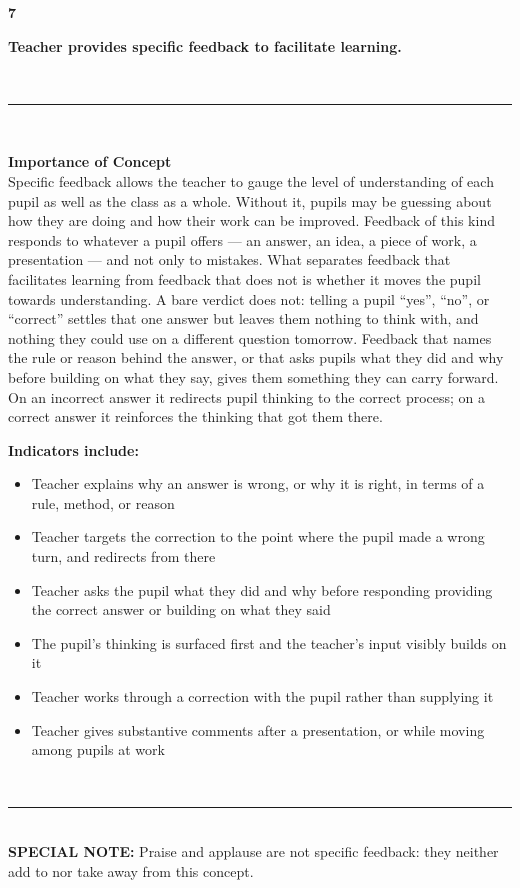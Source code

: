 \documentclass[10pt,a4paper]{article}
\newcommand{\conceptheader}[2]{%
  \noindent
  \begin{minipage}[c]{13mm}\raggedright
    {\fontsize{30}{30}\selectfont\bfseries\color{tnavy}#1}
  \end{minipage}%
  \begin{minipage}[c]{\dimexpr\linewidth-13mm\relax}\RaggedRight
    {\large\bfseries #2}
  \end{minipage}\\[1.5mm]
  \textcolor{tnavy}{\rule{\linewidth}{1.1pt}}\\[2mm]}
\newcommand{\twopane}[2]{%
  \noindent
  \begin{minipage}[t]{0.475\linewidth}\RaggedRight
    {\bfseries\small Importance of Concept}\\[1.4mm]
    \footnotesize #1 \normalsize
  \end{minipage}\hfill
  \begin{minipage}[t]{0.475\linewidth}\RaggedRight
    {\bfseries\small Indicators include:}\\[0.6mm]
    #2
  \end{minipage}\\[2mm]}
\newcommand{\specialnote}[1]{%
  \noindent\textcolor{trule}{\rule{\linewidth}{0.4pt}}\\[1.2mm]
  {\footnotesize\textbf{SPECIAL NOTE:} #1}\\[2mm]}
\begin{document}
\clearpage



\conceptheader{7}{Teacher provides specific feedback to facilitate learning.}
\twopane{Specific feedback allows the teacher to gauge the level of understanding of each pupil as well as the class as a whole. Without it, pupils may be guessing about how they are doing and how their work can be improved. Feedback of this kind responds to whatever a pupil offers --- an answer, an idea, a piece of work, a presentation --- and not only to mistakes. What separates feedback that facilitates learning from feedback that does not is whether it moves the pupil towards understanding. A bare verdict does not: telling a pupil ``yes'', ``no'', or ``correct'' settles that one answer but leaves them nothing to think with, and nothing they could use on a different question tomorrow. Feedback that names the rule or reason behind the answer, or that asks pupils what they did and why before building on what they say, gives them something they can carry forward. On an incorrect answer it redirects pupil thinking to the correct process; on a correct answer it reinforces the thinking that got them there.}{\footnotesize\begin{itemize}
  \item Teacher explains why an answer is wrong, or why it is right, in terms of a rule, method, or reason
  \item Teacher targets the correction to the point where the pupil made a wrong turn, and redirects from there
  \item Teacher asks the pupil what they did and why before responding providing the correct answer or building on what they said
  \item The pupil's thinking is surfaced first and the teacher's input visibly builds on it
  \item Teacher works through a correction with the pupil rather than supplying it
  \item Teacher gives substantive comments after a presentation, or while moving among pupils at work
\end{itemize}\normalsize}
\specialnote{Praise and applause are not specific feedback: they neither add to nor take away from this concept.}
\end{document}
